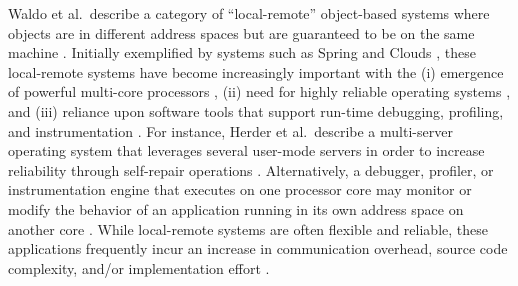 \documentclass{sig-alternate}
\begin{document}


				   



Waldo et al.\ describe a category of ``local-remote'' object-based
systems where objects are in different address spaces but are
guaranteed to be on the same machine \cite{waldo-note}.  Initially
exemplified by systems such as Spring \cite{radia-spring} and Clouds
\cite{dasgupta-clouds}, these local-remote systems have become
increasingly important with the (i) emergence of powerful multi-core
processors \cite{lowney-multi-core,schalnsker-multi-core}, (ii) need
for highly reliable operating systems
\cite{tanenbaum-minix3,herder-microkernel}, and (iii) reliance upon
software tools that support run-time debugging, profiling, and
instrumentation
\cite{binder-instrument,harkema-perf-monitor,wallace07superpin}.  For
instance, Herder et al.\ describe a multi-server operating system that
leverages several user-mode servers in order to increase reliability
through self-repair operations
\cite{tanenbaum-minix3,herder-microkernel}.  Alternatively, a
debugger, profiler, or instrumentation engine that executes on one
processor core may monitor or modify the behavior of an application
running in its own address space on another core
\cite{binder-instrument,harkema-perf-monitor,wallace07superpin}.
While local-remote systems are often flexible and reliable, these
applications frequently incur an increase in communication overhead,
source code complexity, and/or implementation effort
\cite{tanenbaum-minix3,tang-code-complex,vaidyanathan-grid}.
\end{document}
